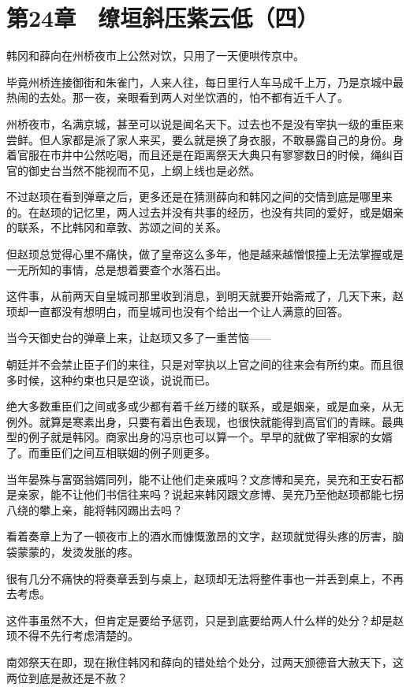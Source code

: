 \section{第24章　缭垣斜压紫云低（四）}

韩冈和薛向在州桥夜市上公然对饮，只用了一天便哄传京中。

毕竟州桥连接御街和朱雀门，人来人往，每日里行人车马成千上万，乃是京城中最热闹的去处。那一夜，亲眼看到两人对坐饮酒的，怕不都有近千人了。

州桥夜市，名满京城，甚至可以说是闻名天下。过去也不是没有宰执一级的重臣来尝鲜。但人家都是派了家人来买，要么就是换了身衣服，不敢暴露自己的身份。身着官服在市井中公然吃喝，而且还是在距离祭天大典只有寥寥数日的时候，绳纠百官的御史台当然不能视而不见，上纲上线也是必然。

不过赵顼在看到弹章之后，更多还是在猜测薛向和韩冈之间的交情到底是哪里来的。在赵顼的记忆里，两人过去并没有共事的经历，也没有共同的爱好，或是姻亲的联系，不比韩冈和章敦、苏颂之间的关系。

但赵顼总觉得心里不痛快，做了皇帝这么多年，他是越来越憎恨撞上无法掌握或是一无所知的事情，总是想着要查个水落石出。

这件事，从前两天自皇城司那里收到消息，到明天就要开始斋戒了，几天下来，赵顼却一直都没有想明白，而皇城司也没有个给出一个让人满意的回答。

当今天御史台的弹章上来，让赵顼又多了一重苦恼——

朝廷并不会禁止臣子们的来往，只是对宰执以上官之间的往来会有所约束。而且很多时候，这种约束也只是空谈，说说而已。

绝大多数重臣们之间或多或少都有着千丝万缕的联系，或是姻亲，或是血亲，从无例外。就算是寒素出身，只要有着出色表现，也很快就能得到高官们的青睐。最典型的例子就是韩冈。商家出身的冯京也可以算一个。早早的就做了宰相家的女婿了。而重臣们之间互相联姻的例子则更多。

当年晏殊与富弼翁婿同列，能不让他们走亲戚吗？文彦博和吴充，吴充和王安石都是亲家，能不让他们书信往来吗？说起来韩冈跟文彦博、吴充乃至他赵顼都能七拐八绕的攀上亲，能将韩冈踢出去吗？

看着奏章上为了一顿夜市上的酒水而慷慨激昂的文字，赵顼就觉得头疼的厉害，脑袋蒙蒙的，发烫发胀的疼。

很有几分不痛快的将奏章丢到与桌上，赵顼却无法将整件事也一并丢到桌上，不再去考虑。

这件事虽然不大，但肯定是要给予惩罚，只是到底要给两人什么样的处分？却是赵顼不得不先行考虑清楚的。

南郊祭天在即，现在揪住韩冈和薛向的错处给个处分，过两天颁德音大赦天下，这两位到底是赦还是不赦？

